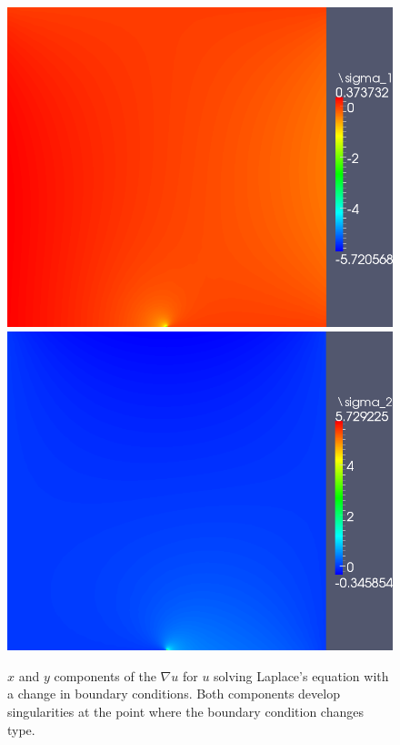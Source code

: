 \documentclass[letterpaper]{article}
\newcommand{\Grad} {\ensuremath{\nabla}}
\begin{document}
\begin{figure}[!h]
\centering
\includegraphics[scale=.275]{figs/LaplaceFigs/LaplacePlateSigma1.png}
\includegraphics[scale=.275]{figs/LaplaceFigs/LaplacePlateSigma2.png}
\caption{$x$ and $y$ components of the $\Grad u$ for $u$ solving Laplace's equation with a change in boundary conditions.  Both components develop singularities at the point where the boundary condition changes type.}
\label{fig:laplaceStresses}
\end{figure}
\end{document}
